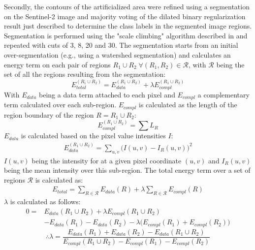 \documentclass[10pt]{article}
\begin{document}
Secondly, the contours of the artificialized area were refined using a segmentation on the Sentinel-2 image and majority voting of the dilated binary regularization result just described to determine the class labels in the segmented image regions. Segmentation is performed using the "scale climbing" algorithm described in \cite{guigues_scale-sets_2003} and repeated with cuts of 3, 8, 20 and 30. The segmentation starts from an initial over-segmentation (e.g., using a watershed segmentation) and calculates an energy term on each pair of regions $R_1\cup R_2\;\forall (R_1,R_2)\in\mathcal{R}$, with $\mathcal{R}$ being the set of all the regions resulting from the segmentation:
\begin{equation}
    E_{total}^{(R_1\cup R_2)}=E_{data}^{(R_1\cup R_2)}+\lambda E_{compl}^{(R_1\cup R_2)}
\end{equation}
With $E_{data}$ being a data term attached to each pixel and $E_{compl}$ a complementary term calculated over each sub-region.
$E_{compl}$ is calculated as the length of the region boundary of the region $R=R_1\cup R_2$:
\begin{equation}
    E^{(R_1\cup R_2)}_{compl}=\sum L_R
\end{equation}
$E_{data}$ is calculated based on the pixel value intensities $I$:
\begin{align}
    E_{data}^{(R_1\cup R_2)}=\sum_{u,v}\big(I(u,v)-I_R(u,v)\big)^2
\end{align}
$I(u,v)$ being the intensity for at a given pixel coordinate $(u,v)$ and $I_R(u,v)$ being the mean intensity over this sub-region. The total energy term over a set of regions $\mathcal{R}$ is calculated as:
\begin{align}
    E_{total}=\sum_{R\in \mathcal{R}} E_{data}(R)+\lambda\sum_{R\in \mathcal{R}} E_{compl}(R)
\end{align}
$\lambda$ is calculated as follows:
\begin{equation}
    \begin{split}
    0=&E_{data}(R_1\cup R_2)+\lambda E_{compl}(R_1\cup R_2)\\
    &-E_{data}(R_1)-E_{data}(R_2)-\lambda\big(E_{compl}(R_1)+E_{compl}(R_2)\big)
    \end{split}
\end{equation}
\begin{equation}
    \therefore \lambda=\frac{E_{data}(R_1)+E_{data}(R_2)-E_{data}(R_1\cup R_2)}{E_{compl}(R_1\cup R_2) -E_{compl}(R_1)-E_{compl}(R_2)}
\end{equation}
\end{document}

